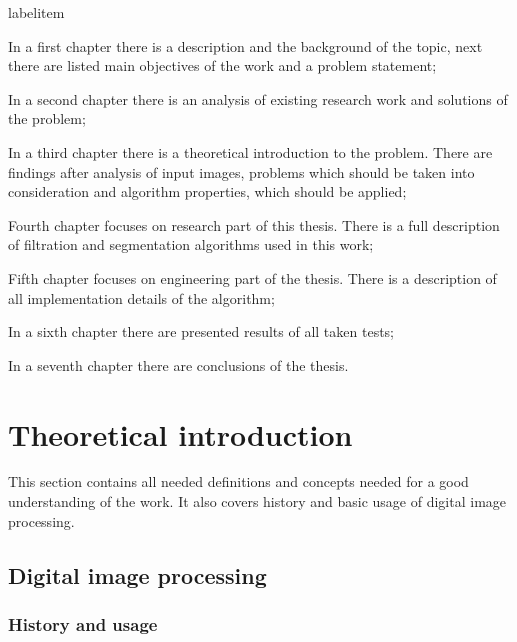 \documentclass[a4paper,onecolumn,oneside,12pt]{memoir}
\makeatletter
\renewenvironment{itemize}{
  \begin{list}{  
  \csname labelitem\romannumeral\the\@listdepth\endcsname}{
  \setlength{\leftmargin}{1em}
	\setlength{\topsep}{6pt}%
	\setlength{\partopsep}{0pt}%
	\setlength{\parskip}{0pt}%
	\setlength{\parsep}{0pt}%
	\setlength{\itemsep}{0pt}}
}{
  \end{list}
}
\makeatother
\begin{document}
\begin{itemize}
  \item In a first chapter there is a description and the background of the topic, 
        next there are listed main objectives of the work and a problem statement;
  \item In a second chapter there is an analysis of existing research work and solutions
        of the problem;
  \item In a third chapter there is a theoretical introduction to the problem. There are 
        findings after analysis of input images, problems which should be taken into consideration
        and algorithm properties, which should be applied;
  \item Fourth chapter focuses on research part of this thesis. There is a full description of
        filtration and segmentation algorithms used in this work;
  \item Fifth chapter focuses on engineering part of the thesis. There is a description of 
        all implementation details of the algorithm;
  \item In a sixth chapter there are presented results of all taken tests;
  \item In a seventh chapter there are conclusions of the thesis.
\end{itemize}

\chapter{Theoretical introduction}

This section contains all needed definitions and concepts needed for a good understanding of the
work. It also covers history and basic usage of digital image processing.

\section{Digital image processing}

\subsection{History and usage}
\end{document}
